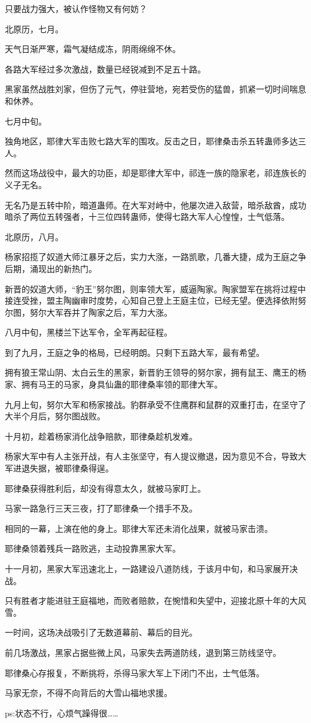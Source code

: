 \begin{this_body}
只要战力强大，被认作怪物又有何妨？

北原历，七月。

天气日渐严寒，霜气凝结成冻，阴雨绵绵不休。

各路大军经过多次激战，数量已经锐减到不足五十路。

黑家虽然战胜刘家，但伤了元气，停驻营地，宛若受伤的猛兽，抓紧一切时间喘息和休养。

七月中旬。

独角地区，耶律大军击败七路大军的围攻。反击之日，耶律桑击杀五转蛊师多达三人。

然而这场战役中，最大的功臣，却是耶律大军中，祁连一族的隐家老，祁连族长的义子无名。

无名乃是五转中阶，暗道蛊师。在大军对峙中，他屡次进入敌营，暗杀敌酋，成功暗杀了两位五转强者，十三位四转蛊师，使得七路大军人心惶惶，士气低落。

北原历，八月。

杨家招揽了奴道大师江暴牙之后，实力大涨，一路凯歌，几番大捷，成为王庭之争后期，涌现出的新热门。

新晋的奴道大师，“豹王”努尔图，则率领大军，威逼陶家。陶家盟军在挑将过程中接连受挫，盟主陶幽审时度势，心知自己登上王庭主位，已经无望。便选择依附努尔图，努尔大军吞并了陶家之后，军力大涨。

八月中旬，黑楼兰下达军令，全军再起征程。

到了九月，王庭之争的格局，已经明朗。只剩下五路大军，最有希望。

拥有狼王常山阴、太白云生的黑家，新晋豹王领导的努尔家，拥有鼠王、鹰王的杨家、拥有马王的马家，身具仙蛊的耶律桑率领的耶律大军。

九月上旬，努尔大军和杨家接战。豹群承受不住鹰群和鼠群的双重打击，在坚守了大半个月后，努尔图战败。

十月初，趁着杨家消化战争赔款，耶律桑趁机发难。

杨家大军中有人主张开战，有人主张坚守，有人提议撤退，因为意见不合，导致大军进退失据，被耶律桑得逞。

耶律桑获得胜利后，却没有得意太久，就被马家盯上。

马家一路急行三天三夜，打了耶律桑一个措手不及。

相同的一幕，上演在他的身上。耶律大军还未消化战果，就被马家击溃。

耶律桑领着残兵一路败逃，主动投靠黑家大军。

十一月初，黑家大军迅速北上，一路建设八道防线，于该月中旬，和马家展开决战。

只有胜者才能进驻王庭福地，而败者赔款，在惋惜和失望中，迎接北原十年的大风雪。

一时间，这场决战吸引了无数道幕前、幕后的目光。

前几场激战，黑家占据些微上风，马家失去两道防线，退到第三防线坚守。

耶律桑心存报复，不断挑将，杀得马家大军上下闭门不出，士气低落。

马家无奈，不得不向背后的大雪山福地求援。

ps:状态不行，心烦气躁得很……

\end{this_body}

